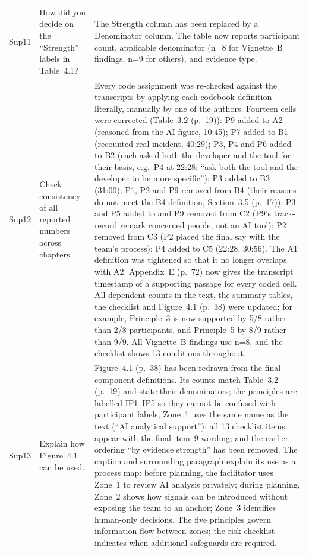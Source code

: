 \documentclass[12pt,a4paper,twoside]{article}
\begin{document}
{\begin{longtable}{p{1cm}p{6.7cm}p{7cm}}
Sup11 &
How did you decide on the ``Strength'' labels in Table~4.1? &
The Strength column has been replaced by a Denominator column. The table now reports
participant count, applicable denominator (n=8 for Vignette~B findings, n=9 for
others), and evidence type. \\

Sup12 &
Check consistency of all reported numbers across chapters. &
Every code assignment was re-checked against the transcripts by applying each codebook definition literally, manually by one of the authors. Fourteen cells were corrected (Table~3.2 (p.~19)): P9 added to A2 (reasoned from the AI figure, 10:45); P7 added to B1 (recounted real incident, 40:29); P3, P4 and P6 added to B2 (each asked both the developer and the tool for their basis, e.g.\ P4 at 22:28: ``ask both the tool and the developer to be more specific''); P3 added to B3 (31:00); P1, P2 and P9 removed from B4 (their reasons do not meet the B4 definition, Section~3.5 (p.~17)); P3 and P5 added to and P9 removed from C2 (P9's track-record remark concerned people, not an AI tool); P2 removed from C3 (P2 placed the final say with the team's process); P4 added to C5 (22:28, 30:56). The A1 definition was tightened so that it no longer overlaps with A2. Appendix~E (p.~72) now gives the transcript timestamp of a supporting passage for every coded cell. All dependent counts in the text, the summary tables, the checklist and Figure~4.1 (p.~38) were updated; for example, Principle~3 is now supported by 5/8 rather than 2/8 participants, and Principle~5 by 8/9 rather than 9/9. All Vignette~B findings use n=8, and the checklist shows 13 conditions throughout. \\

Sup13 &
Explain how Figure~4.1 can be used. &
Figure~4.1 (p.~38) has been redrawn from the final component definitions. Its counts match Table~3.2 (p.~19) and state their denominators; the principles are labelled IP1--IP5 so they cannot be confused with participant labels; Zone~1 uses the same name as the text (``AI analytical support''); all 13 checklist items appear with the final item~9 wording; and the earlier ordering ``by evidence strength'' has been removed. The caption and surrounding paragraph explain its use as a process map: before planning, the facilitator uses Zone~1 to review AI analysis privately; during planning, Zone~2 shows how signals can be introduced without exposing the team to an anchor; Zone~3 identifies human-only decisions. The five principles govern information flow between zones; the risk checklist indicates when additional safeguards are required. \\

\end{longtable}
}
\end{document}
